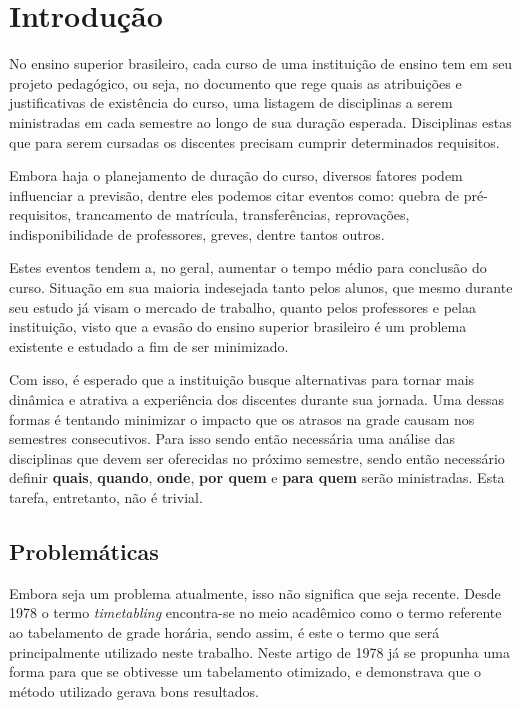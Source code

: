 \chapter{Introdução} \label{chap:introducao}             %

No ensino superior brasileiro, cada curso de uma instituição de ensino tem em seu projeto pedagógico, ou seja, no documento que rege quais as atribuições e justificativas de existência do curso, uma listagem de disciplinas a serem ministradas em cada semestre ao longo de sua duração esperada. Disciplinas estas que para serem cursadas os discentes precisam cumprir determinados requisitos.

Embora haja o planejamento de duração do curso, diversos fatores podem influenciar a previsão, dentre eles podemos citar eventos como: quebra de pré-requisitos, trancamento de matrícula, transferências, reprovações, indisponibilidade de professores, greves, dentre tantos outros.

Estes eventos tendem a, no geral, aumentar o tempo médio para conclusão do curso. Situação em sua maioria indesejada tanto pelos alunos, que mesmo durante seu estudo já visam o mercado de trabalho, quanto pelos professores e pelaa instituição, visto que a evasão do ensino superior brasileiro é um problema existente e estudado a fim de ser minimizado.

Com isso, é esperado que a instituição busque alternativas para tornar mais dinâmica e atrativa a experiência dos discentes durante sua jornada. Uma dessas formas é tentando minimizar o impacto que os atrasos na grade causam nos semestres consecutivos. Para isso sendo então necessária uma análise das disciplinas que devem ser oferecidas no próximo semestre, sendo então necessário definir \textbf{quais}, \textbf{quando}, \textbf{onde}, \textbf{por quem} e \textbf{para quem} serão ministradas. Esta tarefa, entretanto, não é trivial.

\section{Problemáticas} \label{sec:Problemáticas}        %

Embora seja um problema atualmente, isso não significa que seja recente. Desde 1978 \cite{BARHAM1978} o termo \textit{timetabling} encontra-se no meio acadêmico como o termo referente ao tabelamento de grade horária, sendo assim, é este o termo que será principalmente utilizado neste trabalho. Neste artigo de 1978 já se propunha uma forma para que se obtivesse um tabelamento otimizado, e demonstrava que o método utilizado gerava bons resultados.


